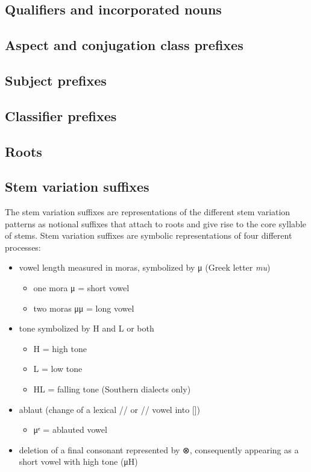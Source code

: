 \subsection{Qualifiers and incorporated nouns}\label{sec:inventory-qualinc}

\subsection{Aspect and conjugation class prefixes}\label{sec:inventory-aspconj}

\subsection{Subject prefixes}\label{sec:inventory-subject}

\subsection{Classifier prefixes}\label{sec:inventory-classifier}

\subsection{Roots}\label{sec:inventory-root}

\subsection{Stem variation suffixes}\label{sec:inventory-stemvar}

The stem variation suffixes are representations of the different stem variation patterns
as notional suffixes that attach to roots and give rise to the core syllable of stems.
Stem variation suffixes are symbolic representations of four different processes:

\begin{itemize}
\item	vowel length measured in moras, symbolized by μ (Greek letter \textit{mu})
	\begin{itemize}
	\item	one mora μ = short vowel
	\item	two moras μμ = long vowel
	\end{itemize}
\item	tone symbolized by H and L or both
	\begin{itemize}
	\item	H = high tone
	\item	L = low tone
	\item	HL = falling tone (Southern dialects only)
	\end{itemize}
\item	ablaut (change of a lexical // or // vowel into [])
	\begin{itemize}
	\item	μᵉ = ablauted vowel
	\end{itemize}
\item	deletion of a final consonant represented by ⊗,
	consequently appearing as a short vowel with high tone (μH)
\end{itemize}

